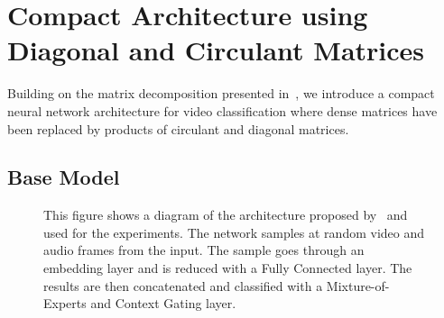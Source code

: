 \section{Compact Architecture using Diagonal and Circulant Matrices}
\label{section:ap2-compact_video_classification_architecture_using_diagonal_and_circulant_matrices}

Building on the matrix decomposition presented in~, we introduce a compact neural network architecture for video classification where dense matrices have been replaced by products of circulant and diagonal matrices.

\subsection{Base Model}
\label{subsection:ap2-base_model}

\begin{figure}[ht]
  \centering
  
  \caption{This figure shows a diagram of the architecture proposed by~\citet{miech2017learnable} and used for the experiments. The network samples at random video and audio frames from the input. The sample goes through an embedding layer and is reduced with a Fully Connected layer. The results are then concatenated and classified with a Mixture-of-Experts and Context Gating layer.}
  \label{figure:ap2-model_baseline}
\end{figure}

